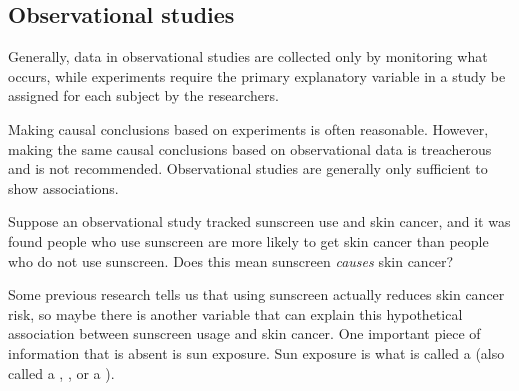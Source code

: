 \subsection{Observational studies}

Generally, data in observational studies are collected only by monitoring what occurs, while experiments require the primary explanatory variable in a study be assigned for each subject by the researchers.

Making causal conclusions based on experiments is often reasonable. However, making the same causal conclusions based on observational data is treacherous and is not recommended. Observational studies are generally only sufficient to show associations.

\begin{exercisewrap}
\begin{nexercise} \label{sunscreenLurkingExample}
Suppose an observational study tracked sunscreen use and skin cancer, and it was found people who use sunscreen are more likely to get skin cancer than people who do not use sunscreen. Does this mean sunscreen \emph{causes} skin cancer?\footnotemark
\end{nexercise}
\end{exercisewrap}

Some previous research tells us that using sunscreen actually reduces skin cancer risk, so maybe there is another variable that can explain this hypothetical association between sunscreen usage and skin cancer. One important piece of information that is absent is sun exposure. Sun exposure is what is called a  (also called a , , or a ).

\D{\newpage}

\begin{center}
\end{center}



